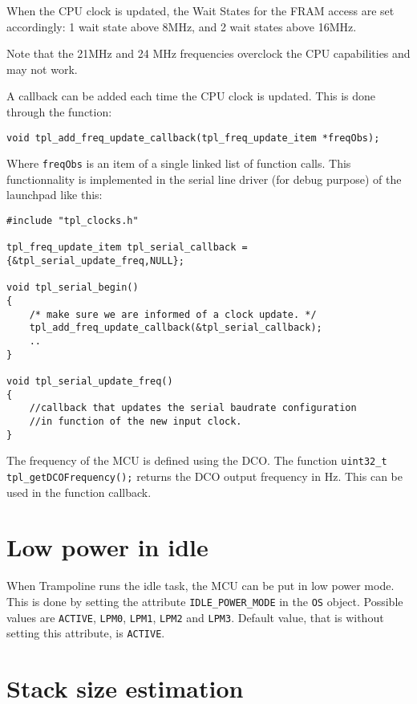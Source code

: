 \documentclass[11pt, oneside]{article}   	%
\begin{document}
When the CPU clock is updated, the Wait States for the FRAM access are set accordingly: 1 wait state above 8MHz, and 2 wait states above 16MHz.

Note that the 21MHz and 24 MHz frequencies overclock the CPU capabilities and may not work.

A callback can be added each time the CPU clock is updated. This is done through the function:
\begin{lstlisting}
void tpl_add_freq_update_callback(tpl_freq_update_item *freqObs);
\end{lstlisting}
Where \lstinline{freqObs} is an item of a single linked list of function calls. This functionnality is implemented in the serial line driver (for debug purpose) of the launchpad like this:

\begin{lstlisting}
#include "tpl_clocks.h"

tpl_freq_update_item tpl_serial_callback = {&tpl_serial_update_freq,NULL};

void tpl_serial_begin()
{
	/* make sure we are informed of a clock update. */
	tpl_add_freq_update_callback(&tpl_serial_callback);
	..
}

void tpl_serial_update_freq()
{
	//callback that updates the serial baudrate configuration
	//in function of the new input clock.
}

\end{lstlisting}

The frequency of the MCU is defined using the DCO. The function \lstinline{uint32_t tpl_getDCOFrequency();} returns the DCO output frequency in Hz. This can be used in the function callback.


\section{Low power in idle}

When Trampoline runs the idle task, the MCU can be put in low power mode. This is done by setting the attribute \lstinline{IDLE_POWER_MODE} in the \lstinline{OS} object. Possible values are \lstinline{ACTIVE}, \lstinline{LPM0}, \lstinline{LPM1}, \lstinline{LPM2} and \lstinline{LPM3}. Default value, that is without setting this attribute, is \lstinline{ACTIVE}.

\section{Stack size estimation}
\end{document}
